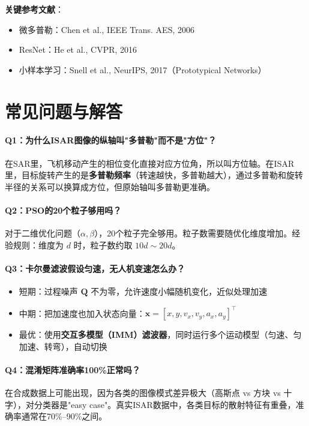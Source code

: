 \documentclass[12pt, a4paper]{article}
\newcommand{\mat}[1]{\boldsymbol{#1}}
\begin{document}
\textbf{关键参考文献}：
\begin{itemize}
  \item 微多普勒：Chen et al., IEEE Trans. AES, 2006
  \item ResNet：He et al., CVPR, 2016
  \item 小样本学习：Snell et al., NeurIPS, 2017（Prototypical Networks）
\end{itemize}


\section{常见问题与解答}

\paragraph{Q1：为什么ISAR图像的纵轴叫"多普勒"而不是"方位"？}
在SAR里，飞机移动产生的相位变化直接对应方位角，所以叫方位轴。在ISAR里，目标旋转产生的是\textbf{多普勒频率}（转速越快，多普勒越大），通过多普勒和旋转半径的关系可以换算成方位，但原始轴叫多普勒更准确。

\paragraph{Q2：PSO的20个粒子够用吗？}
对于二维优化问题（$\alpha, \beta$），20个粒子完全够用。粒子数需要随优化维度增加。经验规则：维度为 $d$ 时，粒子数约取 $10d \sim 20d$。

\paragraph{Q3：卡尔曼滤波假设匀速，无人机变速怎么办？}
\begin{itemize}
  \item 短期：过程噪声 $\mat{Q}$ 不为零，允许速度小幅随机变化，近似处理加速
  \item 中期：把加速度也加入状态向量：$\mat{x} = [x, y, v_x, v_y, a_x, a_y]^\top$
  \item 最优：使用\textbf{交互多模型（IMM）滤波器}，同时运行多个运动模型（匀速、匀加速、转弯），自动切换
\end{itemize}

\paragraph{Q4：混淆矩阵准确率100\%正常吗？}
在合成数据上可能出现，因为各类的图像模式差异极大（高斯点 vs 方块 vs 十字），对分类器是"easy case"。真实ISAR数据中，各类目标的散射特征有重叠，准确率通常在70\%--90\%之间。
\end{document}
